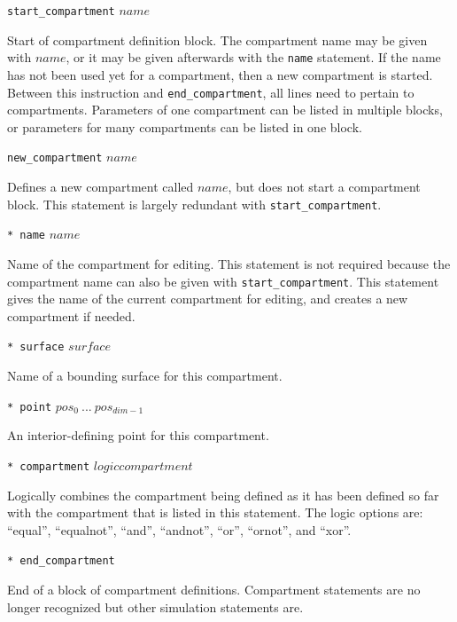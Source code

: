 \documentclass {scrbook}
\newcommand {\ttt} {\texttt}
\begin{document}
\begin{description}

\item{\ttt{start\_compartment} $name$}

Start of compartment definition block. The compartment name may be given with $name$, or it may be given afterwards with the \ttt{name} statement. If the name has not been used yet for a compartment, then a new compartment is started. Between this instruction and \ttt{end\_compartment}, all lines need to pertain to compartments. Parameters of one compartment can be listed in multiple blocks, or parameters for many compartments can be listed in one block.

\item{\ttt{new\_compartment} $name$}

Defines a new compartment called $name$, but does not start a compartment block. This statement is largely redundant with \ttt{start\_compartment}.

\item{\ttt{* name} $name$}

Name of the compartment for editing. This statement is not required because the compartment name can also be given with \ttt{start\_compartment}. This statement gives the name of the current compartment for editing, and creates a new compartment if needed.

\item{\ttt{* surface} $surface$}

Name of a bounding surface for this compartment.

\item{\ttt{* point} $pos_0\ ...\ pos_{dim-1}$}

An interior-defining point for this compartment.

\item{\ttt{* compartment} $logic compartment$}

Logically combines the compartment being defined as it has been defined so far with the compartment that is listed in this statement. The logic options are: ``equal'', ``equalnot'', ``and'', ``andnot'', ``or'', ``ornot'', and ``xor''.

\item{\ttt{* end\_compartment}}

End of a block of compartment definitions. Compartment statements are no longer recognized but other simulation statements are.

\end{description}
\end{document}
